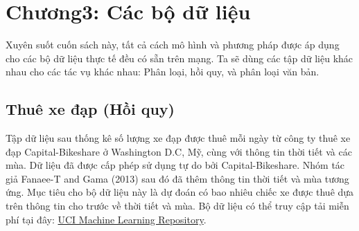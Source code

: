 \chapter*{Chương3: Các bộ dữ liệu}

Xuyên suốt cuốn sách này, tất cả cách mô hình và phương pháp được áp dụng cho các bộ dữ liệu thực tế đều có sẵn trên mạng. Ta sẽ dùng các tập dữ liệu khác nhau cho các tác vụ khác nhau: Phân loại, hồi quy, và phân loại văn bản.

\section{Thuê xe đạp (Hồi quy)}\label{chap_3.1}
Tập dữ liệu sau thống kê số lượng xe đạp được thuê mỗi ngày từ công ty thuê xe đạp Capital-Bikeshare ở Washington D.C, Mỹ, cùng với thông tin thời tiết và các mùa. Dữ liệu đã được cấp phép sử dụng tự do bởi Capital-Bikeshare. Nhóm tác giả Fanaee-T and Gama (2013) sau đó đã thêm thông tin thời tiết và mùa tương ứng. Mục tiêu cho bộ dữ liệu này là dự đoán có bao nhiêu chiếc xe được thuê dựa trên thông tin cho trước về thời tiết và mùa. Bộ dữ liệu có thể truy cập tải miễn phí tại đây: \href{http://archive.ics.uci.edu/ml/datasets/Bike+Sharing+Dataset}{UCI Machine Learning Repository}. 

